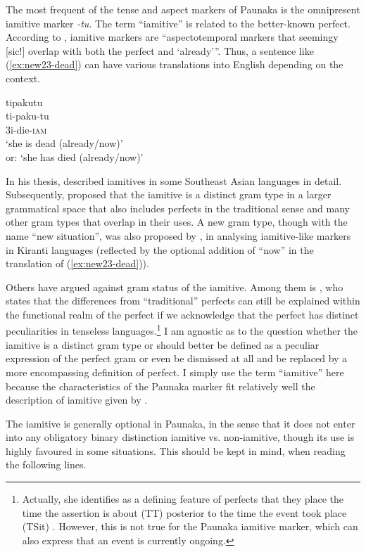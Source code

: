 The most frequent of the tense and aspect markers of Paunaka is the omnipresent iamitive marker \textit{-tu}. The term “iamitive” is related to the better-known perfect. According to \citet[4]{Olsson2013}, iamitive markers are “aspectotemporal markers that seemingy [sic!] overlap with both the perfect and ‘already’”. Thus, a sentence like (\ref{ex:new23-dead}) can have various translations into English depending on the context.

\ea\label{ex:new23-dead}
\begingl
\glpreamble tipakutu\\
\gla ti-paku-tu\\
\glb 3i-die-\textsc{iam}\\
\glft ‘she is dead (already/now)’ \\or: ‘she has died (already/now)’
\endgl
\xe

In his thesis, \citet[]{Olsson2013} described iamitives in some Southeast Asian languages in detail. Subsequently, \citet[]{DahlWalchli2016} proposed that the iamitive is a distinct gram type in a larger grammatical space that also includes perfects in the traditional sense and many other gram types that overlap in their uses. A new gram type, though with the name “new situation”, was also proposed by \citet[]{Ebert2001}, in analysing iamitive-like markers in Kiranti languages (reflected by the optional addition of “now” in the translation of (\ref{ex:new23-dead})).

Others have argued against gram status of the iamitive. Among them is \citet[]{Krajinovic2019}, who states that the differences from “traditional” perfects can still be explained within the functional realm of the perfect if we acknowledge that the perfect has distinct peculiarities in tenseless languages.\footnote{Actually, she identifies as a defining feature of perfects that they place the time the assertion is about (TT) posterior to the time the event took place (TSit) \citep[107]{Krajinovic2019}. However, this is not true for the Paunaka iamitive marker, which can also express that an event is currently ongoing.} I am agnostic as to the question whether the iamitive is a distinct gram type or should better be defined as a peculiar expression of the perfect gram or even be dismissed at all and be replaced by a more encompassing definition of perfect. I simply use the term “iamitive” here because the characteristics of the Paunaka marker fit relatively well the description of iamitive given by \citet[]{Olsson2013}. 

The iamitive is generally optional in Paunaka, in the sense that it does not enter into any obligatory binary distinction iamitive vs. non-iamitive, though its use is highly favoured in some situations. This should be kept in mind, when reading the following lines. 


